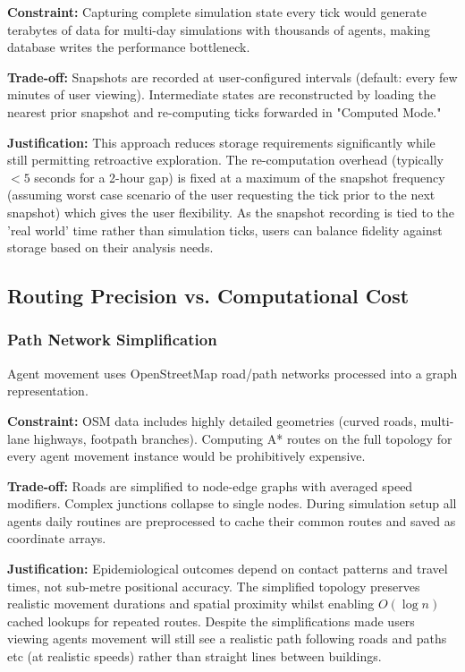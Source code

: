\textbf{Constraint:} Capturing complete simulation state every tick would generate terabytes of data for multi-day simulations with thousands of agents, making database writes the performance bottleneck.

\textbf{Trade-off:} Snapshots are recorded at user-configured intervals (default: every few minutes of user viewing). Intermediate states are reconstructed by loading the nearest prior snapshot and re-computing ticks forwarded in "Computed Mode."

\textbf{Justification:} This approach reduces storage requirements significantly while still permitting retroactive exploration. The re-computation overhead (typically $<5$ seconds for a 2-hour gap) is fixed at a maximum of the snapshot frequency (assuming worst case scenario of the user requesting the tick prior to the next snapshot) which gives the user flexibility. As the snapshot recording is tied to the 'real world' time rather than simulation ticks, users can balance fidelity against storage based on their analysis needs.

\subsection{Routing Precision vs. Computational Cost}

\subsubsection*{Path Network Simplification}
Agent movement uses OpenStreetMap road/path networks processed into a graph representation.

\textbf{Constraint:} OSM data includes highly detailed geometries (curved roads, multi-lane highways, footpath branches). Computing A* routes on the full topology for every agent movement instance would be prohibitively expensive.

\textbf{Trade-off:} Roads are simplified to node-edge graphs with averaged speed modifiers. Complex junctions collapse to single nodes. During simulation setup all agents daily routines are preprocessed to cache their common routes and saved as coordinate arrays.

\textbf{Justification:} Epidemiological outcomes depend on contact patterns and travel times, not sub-metre positional accuracy. The simplified topology preserves realistic movement durations and spatial proximity whilst enabling $O(\log n)$ cached lookups for repeated routes. Despite the simplifications made users viewing agents movement will still see a realistic path following roads and paths etc (at realistic speeds) rather than straight lines between buildings.


